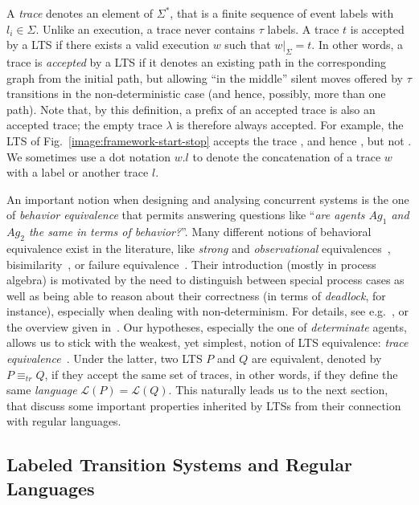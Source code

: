 A \emph{trace} denotes an element of $\Sigma^*$, that is a finite sequence of event labels  with $l_i \in \Sigma$. Unlike an execution, a trace never contains $\tau$ labels. A trace $t$ is accepted by a LTS if there exists a valid execution $w$ such that $w|_{\Sigma} = t$. In other words, a trace is \emph{accepted} by a LTS if it denotes an existing path in the corresponding graph from the initial path, but allowing ``in the middle'' silent moves offered by $\tau$ transitions in the non-deterministic case (and hence, possibly, more than one path). Note that, by this definition, a prefix of an accepted trace is also an accepted trace; the empty trace $\lambda$ is therefore always accepted. For example, the LTS of Fig.~\ref{image:framework-start-stop} accepts the trace , and hence , but not . We sometimes use a dot notation $w.l$ to denote the concatenation of a trace $w$ with a label or another trace $l$.

An important notion when designing and analysing concurrent systems is the one of \emph{behavior equivalence} that permits answering questions like ``\emph{are agents $Ag_1$ and $Ag_2$ the same in terms of behavior?}''. Many different notions of behavioral equivalence exist in the literature, like \emph{strong} and \emph{observational}  equivalences~\cite{Milner:1989}, bisimilarity~\cite{Park:1981}, or failure equivalence~\cite{Hoare:1985}. Their introduction (mostly in process algebra) is motivated by the need to distinguish between special process cases as well as being able to reason about their correctness (in terms of \emph{deadlock}, for instance), especially when dealing with non-determinism. For details, see e.g.~\cite[chap. 3]{Hoare:1985}, \cite[chap. 4 \& 5]{Milner:1989} or the overview given in~\cite{Fernandez:1991}. Our hypotheses, especially the one of \emph{determinate} agents, allows us to stick with the weakest, yet simplest, notion of LTS equivalence: \emph{trace equivalence}~\cite{Hoare:1985, Engelfriet:1985}. Under the latter, two LTS $P$ and $Q$ are equivalent, denoted by $P \equiv_{tr} Q$, if they accept the same set of traces, in other words, if they define the same \emph{language} $\mathcal{L}(P) = \mathcal{L}(Q)$. This naturally leads us to the next section, that discuss some important properties inherited by LTSs from their connection with regular languages. 

\subsection{Labeled Transition Systems and Regular Languages\label{section:background-lts-and-regular-languages}}


